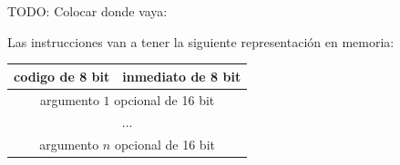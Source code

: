  
  TODO: Colocar donde vaya:

  Las instrucciones van a tener la siguiente representación en memoria:

  \begin{center}
      \begin{tabular}{|c|c|}
      \hline
      codigo de 8 bit & \cellcolor{gray!25}inmediato de 8 bit \\
      \hline
      \multicolumn{2}{|c|}{argumento $1$ opcional de 16 bit} \\
      \hline
      \multicolumn{2}{|c|}{...} \\
      \hline
      \multicolumn{2}{|c|}{argumento $n$ opcional de 16 bit} \\
      \hline
      \end{tabular}
  \end{center}


